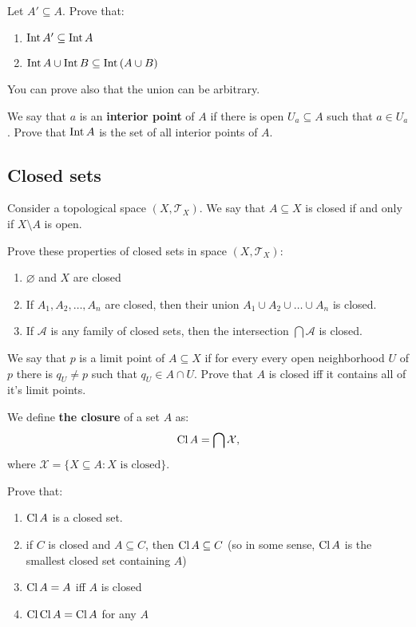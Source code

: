 \begin{prob}
  Let $A'\subseteq A$. Prove that:
  \begin{enumerate}
    \item $\text{Int\,} A' \subseteq \text{Int\,} A$
    \item $\text{Int\,} A \cup \text{Int\,} B\subseteq \text{Int\,} (A\cup B)$
  \end{enumerate}
  You can prove also that the union can be arbitrary.
\end{prob}

\begin{prob}
	We say that $a$ is an \textbf{interior point} of $A$ if there is open $U_a\subseteq A$ such that $a\in U_a$. Prove that $\text{Int\,} A$ is the set
	of all interior points of $A$.
\end{prob}

\subsection{Closed sets}
Consider a topological space $(X, \mathcal T_X)$. We say that $A\subseteq X$ is closed if and only if $X\setminus A$ is open.

\begin{prob}
  Prove these properties of closed sets in space $(X, \mathcal T_X)$:
  \begin{enumerate}
    \item $\varnothing$ and  $X$ are closed
    \item If $A_1, A_2,\dots, A_n$ are closed, then their
      union $A_1\cup A_2\cup\dots\cup A_n$ is closed.
    \item If $\mathcal A$ is any family of
      closed sets, then the intersection $\bigcap \mathcal A$ is
      closed.
  \end{enumerate}
\end{prob}

\begin{prob}
  We say that $p$ is a limit point of $A\subseteq X$ if for every every open neighborhood $U$ of $p$ there is $q_U\neq p$ such that
  $q_U\in A\cap U$. Prove that $A$ is closed iff it contains all
  of it's limit points.
\end{prob}

\noindent We define \textbf{the closure} of a set $A$ as:
$$\text{Cl\,} A = \bigcap \mathcal X,$$
where $\mathcal X = \{X\subseteq A : X \text{ is closed} \}$.

\begin{prob}
  Prove that:
  \begin{enumerate}
    \item $\text{Cl\,} A$ is a closed set.
    \item if $C$ is closed and $A\subseteq C$,
    then $\text{Cl\,} A\subseteq C$ (so in some sense,
    $\text{Cl\,} A$ is the smallest closed set containing $A$)
    \item $\text{Cl\,} A = A$ iff $A$ is closed
    \item $\text{Cl\,} \text{Cl\,} A = \text{Cl\,} A$ for any $A$
  \end{enumerate}
\end{prob}

